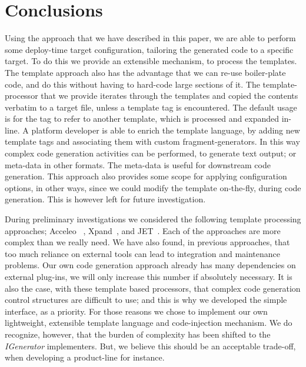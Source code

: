 \documentclass{llncs}%
\begin{document}
%
\section{Conclusions}
Using the approach that we have described in this paper, we are able to perform some deploy-time target configuration, tailoring the generated code to a specific target. To do this we provide an extensible mechanism, to process the templates. The template approach also has the advantage that we can re-use boiler-plate code, and do this without having to hard-code large sections of it. The template-processor that we provide iterates through the templates and copied the contents verbatim to a target file, unless a template tag is encountered. The default usage is for the tag to refer to another template, which is processed and expanded in-line. A platform developer is able to enrich the template language, by adding new template tags and associating them with custom fragment-generators. In this way complex code generation activities can be performed, to generate text output; or meta-data in other formats. The meta-data is useful for downstream code generation. This approach also provides some scope for applying configuration options, in other ways, since we could modify the template on-the-fly, during code generation. This is however left for future investigation. 

During preliminary investigations we considered the following template processing approaches; Acceleo~\cite{acceleo} , Xpand~\cite{xpand}, and JET~\cite{JET}. Each of the approaches are more complex than we really need. We have also found, in previous approaches, that too much reliance on external tools can lead to integration and maintenance problems. Our own code generation approach already has many dependencies on external plug-ins, we will only increase this number if absolutely necessary. It is also the case, with these template based processors, that complex code generation control structures are difficult to use; and this is why we developed the simple interface, as a priority.  For those reasons we chose to implement our own lightweight, extensible template language and code-injection mechanism. We do recognize, however, that the burden of complexity has been shifted to the \emph{IGenerator} implementers. But, we believe this should be an acceptable trade-off, when developing a product-line for instance. 
%


%
%
%
\end{document}
